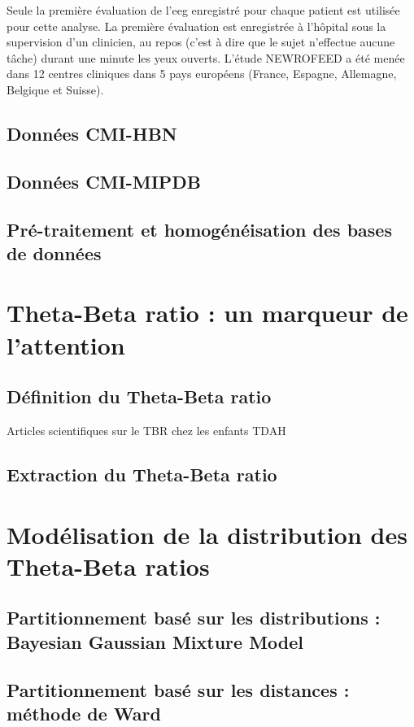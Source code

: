 Seule la première évaluation de l'\gls{eeg} enregistré pour chaque patient est utilisée pour cette analyse. La première évaluation est 
enregistrée à l'hôpital sous la supervision d'un clinicien, au repos (c'est à dire que le sujet n'effectue aucune tâche) durant une minute 
les yeux ouverts. L'étude NEWROFEED a été menée dans 12 centres cliniques dans 5 pays européens (France, Espagne, Allemagne, Belgique et Suisse).



\subsection{Données CMI-HBN}

\subsection{Données CMI-MIPDB}

\subsection{Pré-traitement et homogénéisation des bases de données}

\section{Theta-Beta ratio : un marqueur de l'attention}

\subsection{Définition du Theta-Beta ratio}
Articles scientifiques sur le TBR chez les enfants TDAH

\subsection{Extraction du Theta-Beta ratio}

\section{Modélisation de la distribution des Theta-Beta ratios}

\subsection{Partitionnement basé sur les distributions : Bayesian Gaussian Mixture Model}

\subsection{Partitionnement basé sur les distances : méthode de Ward}

